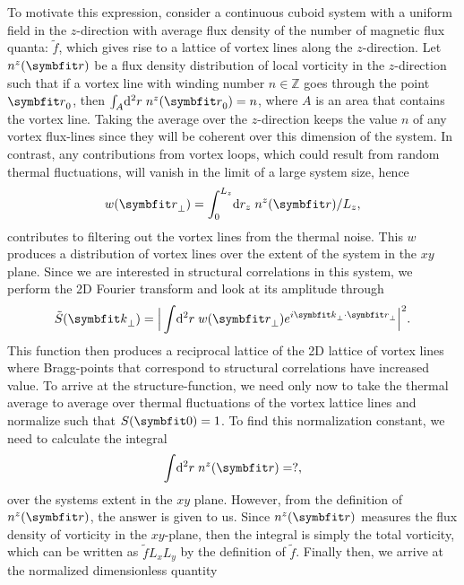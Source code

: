 To motivate this expression, consider a continuous cuboid system with a uniform field in the $z$-direction with average flux density of the number of magnetic flux quanta: $\tilde{f}$, which gives rise to a lattice of vortex
lines along the $z$-direction. Let $n^z(\v{r})$ be a flux density distribution of local vorticity in the $z$-direction such that if a vortex line with winding number $n\in\mathbb{Z}$ goes through the point $\v{r}_0$,
then $\int_A\!\mathrm{d}^2r\;n^z(\v{r}_0) = n$, where $A$ is an area that contains the vortex line.
Taking the average over the $z$-direction keeps the value $n$ of any vortex flux-lines since they will be coherent over this
dimension of the system. In contrast, any contributions from vortex loops, which could result from random thermal fluctuations, will vanish in the limit of a large system size, hence
\begin{equation}
    w(\v{r}_\perp) = \int_0^{L_z}\!\mathrm{d}r_z\;n^z(\v{r}) / L_z,
    \label{eq:Vor:Symm:SF:Cont:xyDist}
\end{equation}
contributes to filtering out the vortex lines from the thermal noise. This $w$ produces a distribution of vortex lines over the extent of the system in the $xy$ plane.
Since we are interested in structural correlations in this system, we perform the 2D Fourier transform and look at its amplitude through
\begin{equation}
    \label{eq:Vor:Symm:SF:Cont:unnormalized}
    \tilde{S}(\v{k}_\perp) = \Big|\int\!\mathrm{d}^2r\;w(\v{r}_\perp)e^{i\v{k}_\perp\cdot\v{r}_\perp}\Big|^2.
\end{equation}
This function then produces a reciprocal lattice of the 2D lattice of vortex lines where Bragg-points that correspond to structural correlations have increased value. To arrive at the structure-function,
we need only now to take the thermal average to average over thermal fluctuations of the vortex lattice lines and normalize such that $S(\v{0})=1$. To find this normalization constant, we need to
calculate the integral
\begin{equation}
    \label{eq:Vor:Symm:SF:Cont:normalizationInt}
    \int\!\mathrm{d}^2r\;n^z(\v{r}) = ?,
\end{equation}
over the systems extent in the $xy$ plane. However, from the definition of $n^z(\v{r})$, the answer is given to us. Since $n^z(\v{r})$ measures the flux density of vorticity in the $xy$-plane, then the integral is simply the total vorticity,
which can be written as $\tilde{f}L_xL_y$ by the definition of $\tilde{f}$. Finally then, we arrive at the normalized dimensionless quantity
